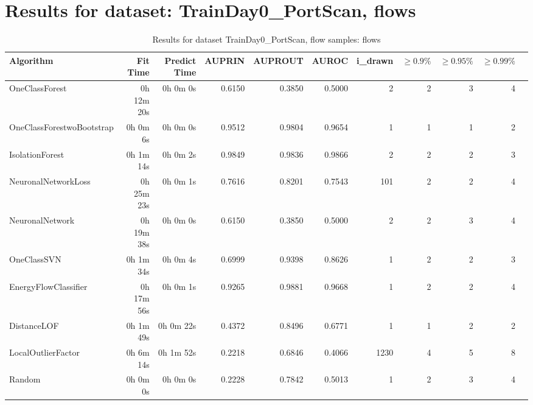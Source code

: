 \documentclass{article}
\begin{document}
\section*{Results for dataset: TrainDay0_PortScan, flows}
\begin{table}[h!]
\centering
\caption{Results for dataset TrainDay0_PortScan, flow samples: flows}
\begin{tabular}{lrrrrrrrrrr}
\toprule
Algorithm & Fit Time & Predict Time & AUPRIN & AUPROUT & AUROC & i\_drawn & $\geq 0.9\%$ & $\geq 0.95\%$ & $\geq 0.99\%$ \\
\midrule
OneClassForest & 0h 12m 20s & 0h 0m 0s & 0.6150 & 0.3850 & 0.5000 & 2 & 2 & 3 & 4 \\
OneClassForestwoBootstrap & 0h 0m 6s & 0h 0m 0s & 0.9512 & 0.9804 & 0.9654 & 1 & 1 & 1 & 2 \\
IsolationForest & 0h 1m 14s & 0h 0m 2s & 0.9849 & 0.9836 & 0.9866 & 2 & 2 & 2 & 3 \\
NeuronalNetworkLoss & 0h 25m 23s & 0h 0m 1s & 0.7616 & 0.8201 & 0.7543 & 101 & 2 & 2 & 4 \\
NeuronalNetwork & 0h 19m 38s & 0h 0m 0s & 0.6150 & 0.3850 & 0.5000 & 2 & 2 & 3 & 4 \\
OneClassSVN & 0h 1m 34s & 0h 0m 4s & 0.6999 & 0.9398 & 0.8626 & 1 & 2 & 2 & 3 \\
EnergyFlowClassifier & 0h 17m 56s & 0h 0m 1s & 0.9265 & 0.9881 & 0.9668 & 1 & 2 & 2 & 4 \\
DistanceLOF & 0h 1m 49s & 0h 0m 22s & 0.4372 & 0.8496 & 0.6771 & 1 & 1 & 2 & 2 \\
LocalOutlierFactor & 0h 6m 14s & 0h 1m 52s & 0.2218 & 0.6846 & 0.4066 & 1230 & 4 & 5 & 8 \\
Random & 0h 0m 0s & 0h 0m 0s & 0.2228 & 0.7842 & 0.5013 & 1 & 2 & 3 & 4 \\
\bottomrule
\end{tabular}
\end{table}
\end{document}
